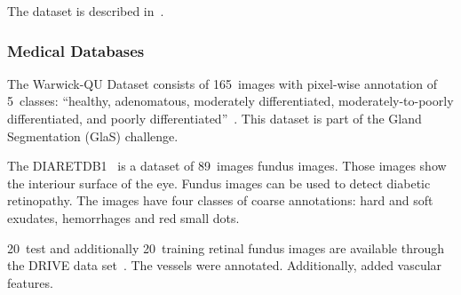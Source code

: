 The dataset is described in~\cite{shotton2006textonboost}.

\subsubsection{Medical Databases}

The Warwick-QU Dataset consists of 165~images with pixel-wise annotation of
5~classes: \enquote{healthy, adenomatous, moderately differentiated,
moderately-to-poorly differentiated, and poorly
differentiated}~\cite{coelho2009nuclear}. This dataset is part of the
Gland Segmentation (GlaS) challenge.

The DIARETDB1~\cite{kalesnykiene2014diaretdb1} is a dataset of 89~images fundus
images. Those images show the interiour surface of the eye. Fundus images can
be used to detect diabetic retinopathy. The images have four classes of coarse
annotations: hard and soft exudates, hemorrhages and red small dots.

20~test and additionally 20~training retinal fundus images are available
through the DRIVE data set~\cite{staal2004ridge}. The vessels were annotated.
Additionally, \cite{azzopardi2011detection} added vascular features.
